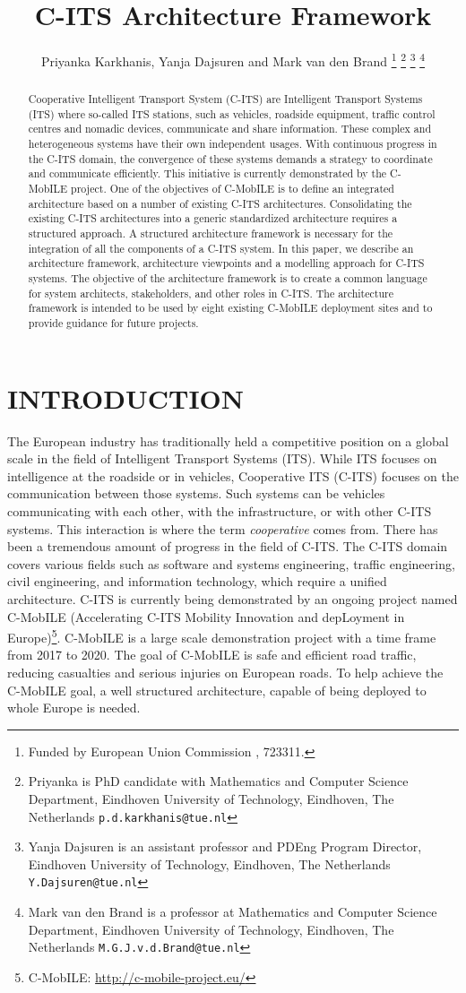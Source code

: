 \documentclass[letterpaper, 10 pt, conference]{ieeeconf}  %
\title{\LARGE \bf
C-ITS Architecture Framework
}
\author{Priyanka Karkhanis, Yanja Dajsuren and Mark van den Brand%
\thanks{Funded by European Union Commission , 723311.}%
\thanks{Priyanka is PhD candidate with Mathematics and Computer Science Department,
     Eindhoven University of Technology, Eindhoven, The Netherlands
        {\tt\small p.d.karkhanis@tue.nl}}%
\thanks{Yanja Dajsuren is an assistant professor and PDEng Program Director,
	 Eindhoven University of Technology, Eindhoven, The Netherlands
        {\tt\small Y.Dajsuren@tue.nl}}%
\thanks{Mark van den Brand is a professor at Mathematics and Computer Science Department,
  	 Eindhoven University of Technology, Eindhoven, The Netherlands
  	{\tt\small M.G.J.v.d.Brand@tue.nl}}%
}
\begin{document}
\maketitle
\thispagestyle{empty}
\pagestyle{empty}


\begin{abstract}

Cooperative Intelligent Transport System (C-ITS) are Intelligent Transport Systems (ITS) where so-called ITS stations, such as vehicles, roadside equipment, traffic control centres and nomadic devices, communicate and share information. These complex and heterogeneous systems have their own independent usages. With continuous progress in the C-ITS domain, the convergence of these systems demands a strategy to coordinate and communicate efficiently. This initiative is currently demonstrated by the C-MobILE project. One of the objectives of C-MobILE is to define an integrated architecture based on a number of existing C-ITS architectures. Consolidating the existing C-ITS architectures into a generic standardized architecture requires a structured approach. A structured architecture framework is necessary for the integration of all the components of a C-ITS system.
In this paper, we describe an architecture framework, architecture viewpoints and a modelling approach for C-ITS systems. The objective of the architecture framework is to create a common language for system architects, stakeholders, and other roles in C-ITS. The architecture framework is intended to be used by eight existing C-MobILE deployment sites and to provide guidance for future projects.

\end{abstract}


\section{INTRODUCTION}
The European industry has traditionally held a competitive position on a global scale in the field of Intelligent Transport Systems (ITS). While ITS focuses on intelligence at the roadside or in vehicles, Cooperative ITS (C-ITS) focuses on the communication between those systems. Such systems can be vehicles communicating with each other, with the infrastructure, or with other C-ITS systems. This interaction is where the term \emph{cooperative} comes from. There has been a tremendous amount of progress in the field of C-ITS. The C-ITS domain covers various fields such as software and systems engineering, traffic engineering, civil engineering, and information technology, which require a unified architecture. C-ITS is currently being demonstrated by an ongoing project named C-MobILE (Accelerating C-ITS Mobility Innovation and depLoyment in Europe)\footnote{C-MobILE: \url{http://c-mobile-project.eu/}}. C-MobILE is a large scale demonstration project with a time frame from 2017 to 2020. The goal of C-MobILE is safe and efficient road traffic, reducing casualties and serious injuries on European roads.
To help achieve the C-MobILE goal, a well structured architecture, capable of being deployed to whole Europe is needed.
\end{document}
